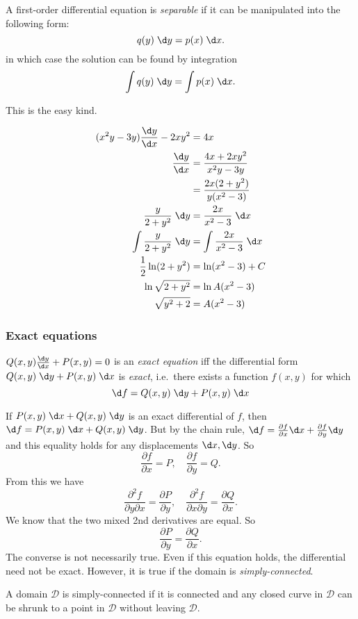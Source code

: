 \documentclass[a4paper]{article}
\begin{document}
\begin{defi}
  A first-order differential equation is \emph{separable} if it can be manipulated into the following form:
  \[
    q(y) \;\d y = p(x) \;\d x.
  \]
  in which case the solution can be found by integration
  \[
    \int q(y)\;\d y = \int p(x)\; \d x.
  \]
\end{defi}
This is the easy kind.

\begin{eg}
  \begin{align*}
    (x^2y - 3y)\frac{\d y}{\d x} - 2xy^2 &= 4x\\
    \frac{\d y}{\d x} &= \frac{4x + 2xy^2}{x^2y - 3y}\\
    &= \frac{2x(2 + y^2)}{y(x^2 - 3)}\\
    \frac{y}{2 + y^2}\; \d y &= \frac{2x}{x^2 - 3}\;\d x\\
    \int \frac{y}{2 + y^2}\; \d y &= \int\frac{2x}{x^2 - 3}\;\d x\\
    \frac{1}{2}\ln(2 + y^2) &= \ln (x^2 - 3) + C\\
    \ln \sqrt{2 + y^2} &= \ln A(x^2 - 3)\\
    \sqrt{y^2 + 2} &= A(x^2 - 3)
  \end{align*}
\end{eg}
\subsubsection{Exact equations}
\begin{defi}
  $Q(x, y)\frac{\d y}{\d x} + P(x, y) = 0$ is an \emph{exact equation} iff the differential form $Q(x, y)\;\d y + P(x, y)\;\d x$ is \emph{exact}, i.e.\ there exists a function $f(x, y)$ for which
  \[
    \d f = Q(x, y)\;\d y + P(x, y)\;\d x
  \]
\end{defi}

If $P(x, y)\;\d x + Q(x, y)\;\d y$ is an exact differential of $f$, then $\d f = P(x, y) \;\d x + Q(x, y)\;\d y$. But by the chain rule, $\d f = \frac{\partial f}{\partial x}\d x + \frac{\partial f}{\partial y}\d y$ and this equality holds for any displacements $\d x, \d y$. So
\[
  \frac{\partial f}{\partial x} = P,\quad\frac{\partial f}{\partial y} = Q.
\]
From this we have
\[
  \frac{\partial^2 f}{\partial y\partial x} = \frac{\partial P}{\partial y},\quad\frac{\partial^2 f}{\partial x \partial y} = \frac{\partial Q}{\partial x}.
\]
We know that the two mixed 2nd derivatives are equal. So
\[
  \frac{\partial P}{\partial y} = \frac{\partial Q}{\partial x}.
\]
The converse is not necessarily true. Even if this equation holds, the differential need not be exact. However, it is true if the domain is \emph{simply-connected}.
\begin{defi}
  A domain $\mathcal{D}$ is simply-connected if it is connected and any closed curve in $\mathcal{D}$ can be shrunk to a point in $\mathcal{D}$ without leaving $\mathcal{D}$.
\end{defi}
\end{document}
